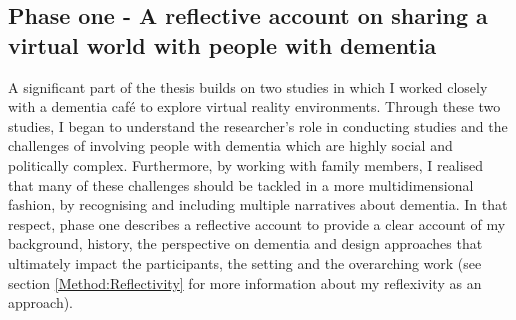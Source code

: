 \begin{table}[htp]
\centering
\caption{Overview of collected data}
\label{tab:OverviewDataCollection}
\end{table}

\subsection{Phase one - A reflective account on sharing a virtual world with people with dementia}

A significant part of the thesis builds on two studies in which I worked closely with a dementia café to explore virtual reality environments. Through these two studies, I began to understand the researcher's role in conducting studies and the challenges of involving people with dementia which are highly social and politically complex. Furthermore, by working with family members, I realised that many of these challenges should be tackled in a more multidimensional fashion, by recognising and including multiple narratives about dementia. In that respect, phase one describes a reflective account to provide a clear account of my background, history, the perspective on dementia and design approaches that ultimately impact the participants, the setting and the overarching work (see section \ref{Method:Reflectivity} for more information about my reflexivity as an approach).

